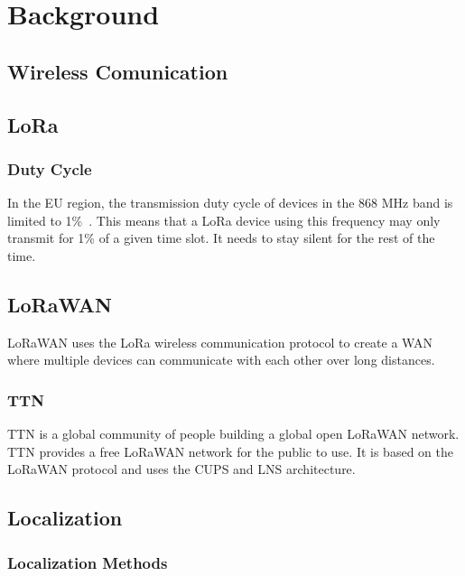 \chapter{Background}

\section{Wireless Comunication}
\section{\acf{LoRa}}


\subsection{Duty Cycle}


In the \ac{EU} region, the transmission duty cycle of devices in the 868 MHz band is limited to 1\%~\cite{etsi_etsi_2012}.
This means that a \ac{LoRa} device using this frequency may only transmit for 1\% of a given time slot.
It needs to stay silent for the rest of the time.

\section{\acf{LoRaWAN}}

\ac{LoRaWAN} uses the LoRa wireless communication protocol to create a \ac{WAN} where multiple devices can communicate with each other over long distances.

\subsection{\acf{TTN}}

\ac{TTN} is a global community of people building a global open \ac{LoRaWAN} network.
\ac{TTN} provides a free \ac{LoRaWAN} network for the public to use.
It is based on the \ac{LoRaWAN} protocol and uses the \ac{CUPS} and \ac{LNS} architecture.


\section{Localization}

\subsection{Localization Methods}

